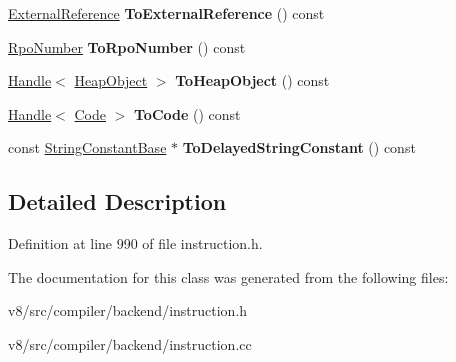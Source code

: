 \begin{DoxyCompactItemize}
\mbox{\hyperlink{classv8_1_1internal_1_1ExternalReference}{External\+Reference}} {\bfseries To\+External\+Reference} () const
\item 
\mbox{\label{classv8_1_1internal_1_1compiler_1_1Constant_a74197737974d0c570df306015b869d2b}} 
\mbox{\hyperlink{classv8_1_1internal_1_1compiler_1_1RpoNumber}{Rpo\+Number}} {\bfseries To\+Rpo\+Number} () const
\item 
\mbox{\label{classv8_1_1internal_1_1compiler_1_1Constant_a1b87da8d01191c5084bcab4677edac18}} 
\mbox{\hyperlink{classv8_1_1internal_1_1Handle}{Handle}}$<$ \mbox{\hyperlink{classv8_1_1internal_1_1HeapObject}{Heap\+Object}} $>$ {\bfseries To\+Heap\+Object} () const
\item 
\mbox{\label{classv8_1_1internal_1_1compiler_1_1Constant_a6d69b8ea3a82838ee0faf17e6bd914c6}} 
\mbox{\hyperlink{classv8_1_1internal_1_1Handle}{Handle}}$<$ \mbox{\hyperlink{classv8_1_1internal_1_1Code}{Code}} $>$ {\bfseries To\+Code} () const
\item 
\mbox{\label{classv8_1_1internal_1_1compiler_1_1Constant_a9aab21c0f1b9e046584b89692d5e9763}} 
const \mbox{\hyperlink{classv8_1_1internal_1_1StringConstantBase}{String\+Constant\+Base}} $\ast$ {\bfseries To\+Delayed\+String\+Constant} () const
\end{DoxyCompactItemize}


\subsection{Detailed Description}


Definition at line 990 of file instruction.\+h.



The documentation for this class was generated from the following files\+:\begin{DoxyCompactItemize}
\item 
v8/src/compiler/backend/instruction.\+h\item 
v8/src/compiler/backend/instruction.\+cc\end{DoxyCompactItemize}
